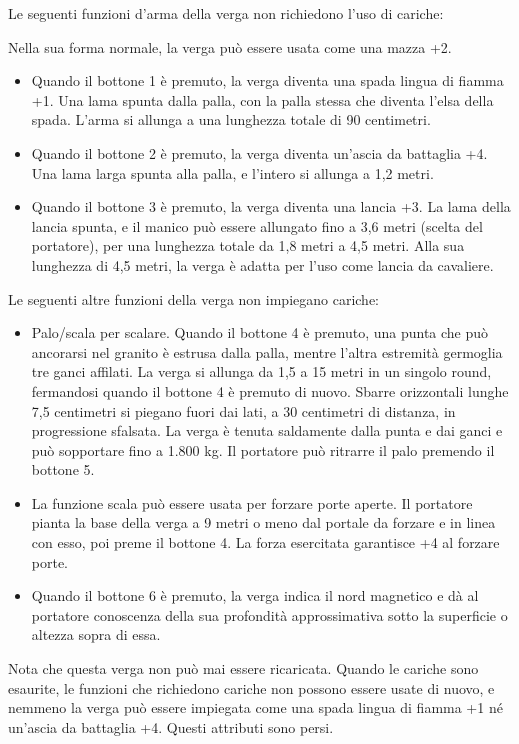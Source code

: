 \documentclass{article}
\begin{document}
\begin{multicols}{2}
Le seguenti funzioni d'arma della verga non richiedono l'uso di cariche:

Nella sua forma normale, la verga può essere usata come una mazza +2.
\begin{itemize}
\item Quando il bottone 1 è premuto, la verga diventa una spada lingua di fiamma +1. Una lama spunta dalla palla, con la palla stessa che diventa l'elsa della spada. L'arma si allunga a una lunghezza totale di 90 centimetri.
\item Quando il bottone 2 è premuto, la verga diventa un'ascia da battaglia +4. Una lama larga spunta alla palla, e l'intero si allunga a 1,2 metri.
\item Quando il bottone 3 è premuto, la verga diventa una lancia +3. La lama della lancia spunta, e il manico può essere allungato fino a 3,6 metri (scelta del portatore), per una lunghezza totale da 1,8 metri a 4,5 metri. Alla sua lunghezza di 4,5 metri, la verga è adatta per l'uso come lancia da cavaliere.
\end{itemize}

Le seguenti altre funzioni della verga non impiegano cariche:
\begin{itemize}
\item Palo/scala per scalare. Quando il bottone 4 è premuto, una punta che può ancorarsi nel granito è estrusa dalla palla, mentre l'altra estremità germoglia tre ganci affilati. La verga si allunga da 1,5 a 15 metri in un singolo round, fermandosi quando il bottone 4 è premuto di nuovo. Sbarre orizzontali lunghe 7,5 centimetri si piegano fuori dai lati, a 30 centimetri di distanza, in progressione sfalsata. La verga è tenuta saldamente dalla punta e dai ganci e può sopportare fino a 1.800 kg. Il portatore può ritrarre il palo premendo il bottone 5.
\item La funzione scala può essere usata per forzare porte aperte. Il portatore pianta la base della verga a 9 metri o meno dal portale da forzare e in linea con esso, poi preme il bottone 4. La forza esercitata garantisce +4 al forzare porte.
\item Quando il bottone 6 è premuto, la verga indica il nord magnetico e dà al portatore conoscenza della sua profondità approssimativa sotto la superficie o altezza sopra di essa.
\end{itemize}

Nota che questa verga non può mai essere ricaricata. Quando le cariche sono esaurite, le funzioni che richiedono cariche non possono essere usate di nuovo, e nemmeno la verga può essere impiegata come una spada lingua di fiamma +1 né un'ascia da battaglia +4. Questi attributi sono persi.


\end{multicols}
\end{document}
